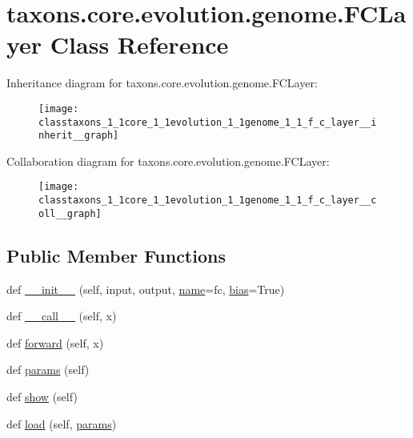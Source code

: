 \hypertarget{classtaxons_1_1core_1_1evolution_1_1genome_1_1_f_c_layer}{}\section{taxons.\+core.\+evolution.\+genome.\+F\+C\+Layer Class Reference}
\label{classtaxons_1_1core_1_1evolution_1_1genome_1_1_f_c_layer}


Inheritance diagram for taxons.\+core.\+evolution.\+genome.\+F\+C\+Layer\+:
\nopagebreak
\begin{figure}[H]
\begin{center}
\leavevmode
\texttt{[image: classtaxons\_1\_1core\_1\_1evolution\_1\_1genome\_1\_1\_f\_c\_layer\_\_inherit\_\_graph]}
\end{center}
\end{figure}


Collaboration diagram for taxons.\+core.\+evolution.\+genome.\+F\+C\+Layer\+:
\nopagebreak
\begin{figure}[H]
\begin{center}
\leavevmode
\texttt{[image: classtaxons\_1\_1core\_1\_1evolution\_1\_1genome\_1\_1\_f\_c\_layer\_\_coll\_\_graph]}
\end{center}
\end{figure}
\subsection*{Public Member Functions}
\begin{DoxyCompactItemize}
\item 
def \hyperlink{classtaxons_1_1core_1_1evolution_1_1genome_1_1_f_c_layer_a81a5239f66386c5820766740c1f3ad98}{\+\_\+\+\_\+init\+\_\+\+\_\+} (self, input, output, \hyperlink{classtaxons_1_1core_1_1evolution_1_1genome_1_1_f_c_layer_a22c79053734a3d92254ab60c11edf015}{name}=\textquotesingle{}fc\textquotesingle{}, \hyperlink{classtaxons_1_1core_1_1evolution_1_1genome_1_1_f_c_layer_a2485852ee4763243988e45ab2cc8b85f}{bias}=True)
\item 
def \hyperlink{classtaxons_1_1core_1_1evolution_1_1genome_1_1_f_c_layer_ab3ec5986547d284cbfe6a4f55b4a6242}{\+\_\+\+\_\+call\+\_\+\+\_\+} (self, x)
\item 
def \hyperlink{classtaxons_1_1core_1_1evolution_1_1genome_1_1_f_c_layer_a59bd60c2e631830d7b3e6c7786aeea02}{forward} (self, x)
\item 
def \hyperlink{classtaxons_1_1core_1_1evolution_1_1genome_1_1_f_c_layer_a83d4dc48b6223387e800074d957ce871}{params} (self)
\item 
def \hyperlink{classtaxons_1_1core_1_1evolution_1_1genome_1_1_f_c_layer_a3e199aef93a36baac7609753aff8227a}{show} (self)
\item 
def \hyperlink{classtaxons_1_1core_1_1evolution_1_1genome_1_1_f_c_layer_a796d322c1a3e2cb231c5dd764c949a50}{load} (self, \hyperlink{classtaxons_1_1core_1_1evolution_1_1genome_1_1_f_c_layer_a83d4dc48b6223387e800074d957ce871}{params})
\end{DoxyCompactItemize}

